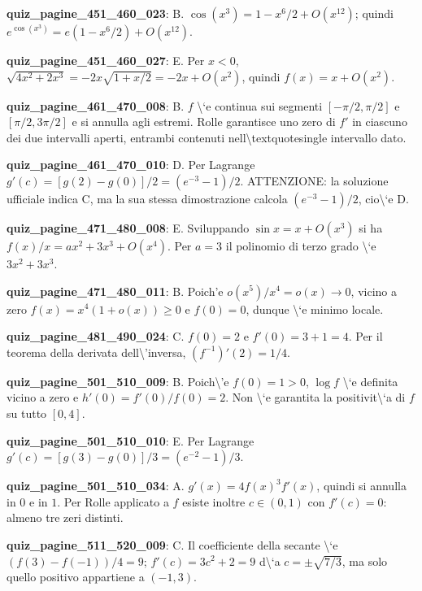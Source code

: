 \documentclass[11pt,a4paper]{article}
\newcounter{quiz}
\begin{document}
\noindent\textbf{quiz\_pagine\_451\_460\_023}: B. $\cos(x^3)=1-x^6/2+O(x^{12})$; quindi $e^{\cos(x^3)}=e(1-x^6/2)+O(x^{12})$.\par\medskip
\noindent\textbf{quiz\_pagine\_451\_460\_027}: E. Per $x<0$, $\sqrt{4x^2+2x^3}=-2x\sqrt{1+x/2}=-2x+O(x^2)$, quindi $f(x)=x+O(x^2)$.\par\medskip
\noindent\textbf{quiz\_pagine\_461\_470\_008}: B. $f$ \textbackslash{}`e continua sui segmenti $[-\pi/2,\pi/2]$ e $[\pi/2,3\pi/2]$ e si annulla agli estremi. Rolle garantisce uno zero di $f\prime$ in ciascuno dei due intervalli aperti, entrambi contenuti nell\textbackslash{}textquotesingle intervallo dato.\par\medskip
\noindent\textbf{quiz\_pagine\_461\_470\_010}: D. Per Lagrange $g\prime(c)=[g(2)-g(0)]/2=(e^{-3}-1)/2$. ATTENZIONE: la soluzione ufficiale indica C, ma la sua stessa dimostrazione calcola $(e^{-3}-1)/2$, cio\textbackslash{}`e D.\par\medskip
\noindent\textbf{quiz\_pagine\_471\_480\_008}: E. Sviluppando $\sin x=x+O(x^3)$ si ha $f(x)/x=ax^2+3x^3+O(x^4)$. Per $a=3$ il polinomio di terzo grado \textbackslash{}`e $3x^2+3x^3$.\par\medskip
\noindent\textbf{quiz\_pagine\_471\_480\_011}: B. Poich'e $o(x^5)/x^4=o(x)\to0$, vicino a zero $f(x)=x^4(1+o(x))\ge0$ e $f(0)=0$, dunque \textbackslash{}`e minimo locale.\par\medskip
\noindent\textbf{quiz\_pagine\_481\_490\_024}: C. $f(0)=2$ e $f\prime(0)=3+1=4$. Per il teorema della derivata dell\textbackslash{}'inversa, $(f^{-1})\prime(2)=1/4$.\par\medskip
\noindent\textbf{quiz\_pagine\_501\_510\_009}: B. Poich\textbackslash{}'e $f(0)=1>0$, $\log f$ \textbackslash{}`e definita vicino a zero e $h\prime(0)=f\prime(0)/f(0)=2$. Non \textbackslash{}`e garantita la positivit\textbackslash{}`a di $f$ su tutto $[0,4]$.\par\medskip
\noindent\textbf{quiz\_pagine\_501\_510\_010}: E. Per Lagrange $g\prime(c)=[g(3)-g(0)]/3=(e^{-2}-1)/3$.\par\medskip
\noindent\textbf{quiz\_pagine\_501\_510\_034}: A. $g\prime(x)=4f(x)^3f\prime(x)$, quindi si annulla in $0$ e in $1$. Per Rolle applicato a $f$ esiste inoltre $c\in(0,1)$ con $f\prime(c)=0$: almeno tre zeri distinti.\par\medskip
\noindent\textbf{quiz\_pagine\_511\_520\_009}: C. Il coefficiente della secante \textbackslash{}`e $(f(3)-f(-1))/4=9$; $f'(c)=3c^2+2=9$ d\textbackslash{}`a $c=\pm\sqrt{7/3}$, ma solo quello positivo appartiene a $(-1,3)$.\par\medskip
\end{document}
